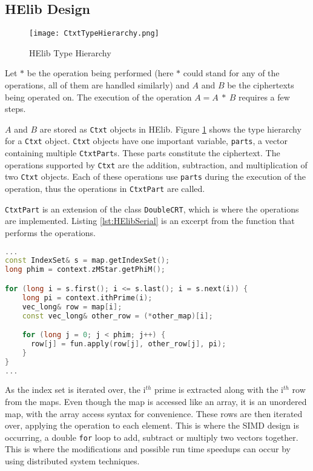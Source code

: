 \subsection{HElib Design} \label{sec:HElibSerialDesign}
\begin{figure}[t!]
\centering
\texttt{[image: CtxtTypeHierarchy.png]}
\caption{HElib Type Hierarchy}
\label{fig:CtxtTypeHierarchy}
\end{figure}

Let $\ast$ be the operation being performed (here $\ast$ could stand for any of the operations, all of them are handled similarly) and $A$ and $B$ be the ciphertexts being operated on. The execution of the operation $ A = A\ \ast\  B$ requires a few steps. 

$A$ and $B$ are stored as \verb|Ctxt| objects in HElib. Figure \ref{fig:CtxtTypeHierarchy} shows the type hierarchy for a \verb|Ctxt| object. \verb|Ctxt| objects have one important variable, \verb|parts|, a vector containing multiple \verb|CtxtPart|s. These parts constitute the ciphertext. The operations supported by \verb|Ctxt| are the addition, subtraction, and multiplication of two \verb|Ctxt| objects. Each of these operations use \verb|parts| during the execution of the operation, thus the operations in \verb|CtxtPart| are called.

\verb|CtxtPart| is an extension of the class \verb|DoubleCRT|, which is where the operations are implemented. Listing \ref{lst:HElibSerial} is an excerpt from the function that performs the operations.

\begin{lstlisting}[language=C++,caption={Add, Sub and Mul operations of two DoubleCRT objects},label={lst:HElibSerial}]
...
const IndexSet& s = map.getIndexSet();
long phim = context.zMStar.getPhiM();

for (long i = s.first(); i <= s.last(); i = s.next(i)) {
    long pi = context.ithPrime(i);
    vec_long& row = map[i];
    const vec_long& other_row = (*other_map)[i];

    for (long j = 0; j < phim; j++) {
      row[j] = fun.apply(row[j], other_row[j], pi);
    }
}
...
\end{lstlisting}

As the index set is iterated over, the i$^{th}$ prime is extracted along with the i$^{th}$ row from the maps. Even though the map is accessed like an array, it is an unordered map, with the array access syntax for convenience. These rows are then iterated over, applying the operation to each element. This is where the SIMD design is occurring, a double \verb|for| loop to add, subtract or multiply two vectors together. This is where the modifications and possible run time speedups can occur by using distributed system techniques.

